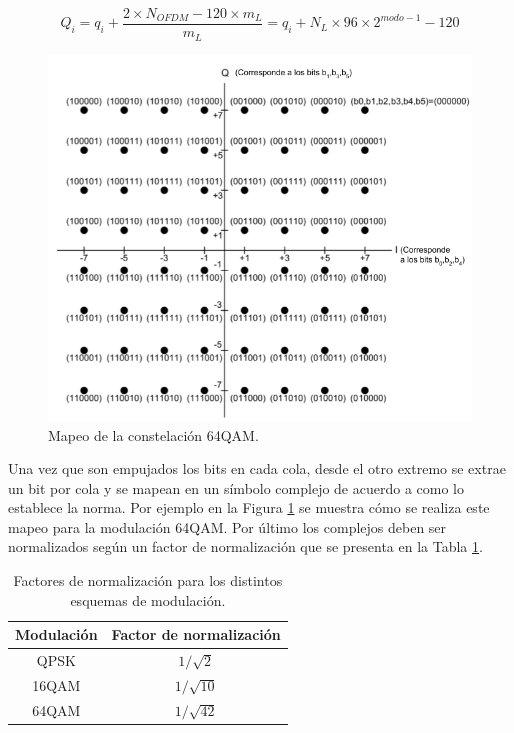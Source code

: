 \begin{equation}
Q_i = q_i + \dfrac{2 \times N_{OFDM} - 120 \times m_L}{m_L} = q_i + N_L \times 96 \times 2^{modo-1} - 120
\end{equation}

\begin{figure}[!h]
\centering
\includegraphics[scale=0.5]{figuras/cap05/constelacion_64QAM}
\caption{\label{f:mapeo_64QAM} Mapeo de la constelaci\'on 64QAM.}
\end{figure}

Una vez que son empujados los bits en cada cola, desde el otro extremo se extrae un bit por cola y se mapean en un s\'imbolo complejo de acuerdo a como lo establece la norma. Por ejemplo en la Figura \ref{f:mapeo_64QAM} se muestra c\'omo se realiza este mapeo para la modulaci\'on 64QAM. Por \'ultimo los complejos deben ser normalizados seg\'un un factor de normalizaci\'on que se presenta en la Tabla \ref{t:factor_normalizacion}.

\begin{table}[h!]
\centering
\begin{tabular}{|c|c|}
\hline
\textbf{Modulaci\'on} 				& \textbf{Factor de normalizaci\'on}\\
\hline
QPSK 		& $1/ \sqrt{2}$\\
\hline
16QAM		& $1/ \sqrt{10}$ \\
\hline
64QAM 		& $1/ \sqrt{42}$ \\
\hline
\end{tabular}
\caption{\label{t:factor_normalizacion} Factores de normalizaci\'on para los distintos esquemas de modulaci\'on.}
\end{table}


